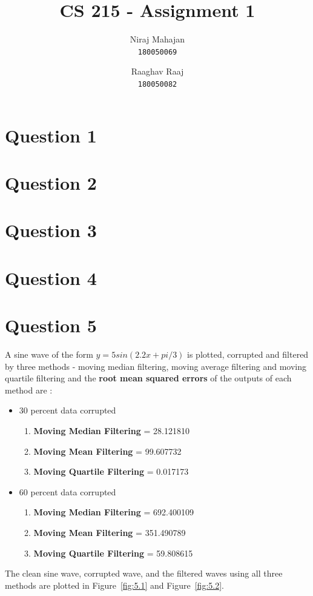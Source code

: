 \documentclass[12pt]{article}
\author{
Niraj Mahajan \\
\texttt{180050069} \and
Raaghav Raaj \\
\texttt{180050082}}
\title{CS 215 - Assignment 1}
\begin{document}
\maketitle
\section{Question 1}
\section{Question 2}
\section{Question 3}
\section{Question 4}



\newpage
\section{Question 5}
A sine wave of the form $y=5sin(2.2x + pi/3)$ is plotted, corrupted and filtered by three methods - moving median filtering, moving average filtering and moving quartile filtering and the \textbf{root mean squared errors} of the outputs of each method are : 
\begin{itemize}
\item 30 percent data corrupted
	\begin{enumerate}
	\item \textbf{Moving Median Filtering} = 28.121810
	\item \textbf{Moving Mean Filtering} = 99.607732
	\item \textbf{Moving Quartile Filtering} = 0.017173
	\end{enumerate}
\item 60 percent data corrupted
	\begin{enumerate}
	\item \textbf{Moving Median Filtering} = 692.400109
	\item \textbf{Moving Mean Filtering} = 351.490789
	\item \textbf{Moving Quartile Filtering} = 59.808615
	\end{enumerate}
\end{itemize}
The clean sine wave, corrupted wave, and the filtered waves using all three methods are plotted in Figure~\ref{fig:5.1} and Figure~\ref{fig:5.2}.
\end{document}
